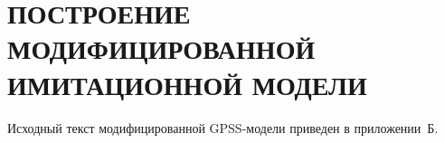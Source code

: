 \section[Построение модифицированной имитационной модели]{
  ПОСТРОЕНИЕ МОДИФИЦИРОВАННОЙ \\
  ИМИТАЦИОННОЙ МОДЕЛИ}

Исходный текст модифицированной GPSS-модели приведен в приложении~Б.